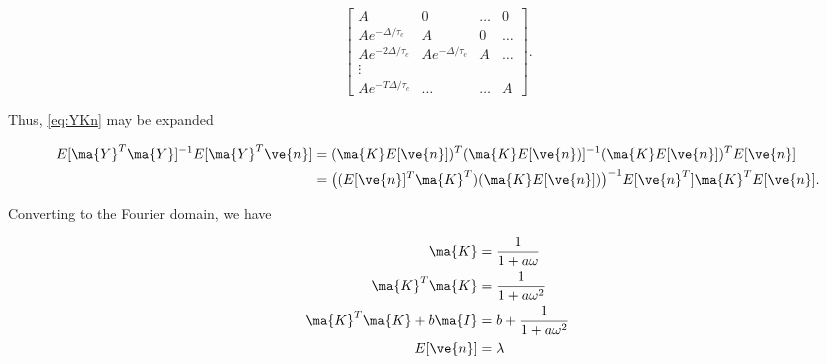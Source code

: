 \begin{equation}
\begin{bmatrix}
A&0&\ldots&0\\
Ae^{-\Delta/\tau_c}&A&0&\ldots\\
Ae^{-2\Delta/\tau_c}&Ae^{-\Delta/\tau_c}&A&\ldots\\
\vdots\\
Ae^{-T\Delta/\tau_c}&\ldots&\ldots&A
\end{bmatrix}.
\end{equation}

Thus, \eqref{eq:YKn} may be expanded

\begin{align}
E[\ma{Y}^T\ma{Y}]^{-1}E[\ma{Y}^T\ve{n}] &= (\ma{K}E[\ve{n}])^T(\ma{K}E[\ve{n})]^{-1} (\ma{K}E[\ve{n}])^T E[\ve{n}]\\
&=\big((E[\ve{n}]^T\ma{K}^T)(\ma{K}E[\ve{n}])\big)^{-1}E[\ve{n}^T]\ma{K}^TE[\ve{n}].
\end{align}

Converting to the Fourier domain, we have

\begin{align}
\ma{K} &= \frac{1}{1+a\omega}\\
\ma{K}^T\ma{K} &= \frac{1}{1+a\omega^2}\\
\ma{K}^T\ma{K}+b\ma{I} &= b+\frac{1}{1+a\omega^2}\\
E[\ve{n}] &= \lambda
\end{align}

